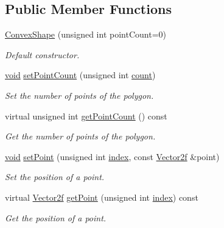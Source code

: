 \subsection*{Public Member Functions}
\begin{DoxyCompactItemize}
\item 
\hyperlink{classsf_1_1_convex_shape_a4f4686f57622bfbbe419ac1420b1432a}{Convex\-Shape} (unsigned int point\-Count=0)
\begin{DoxyCompactList}\small\item\em Default constructor. \end{DoxyCompactList}\item 
\hyperlink{glutf90_8h_ac778d6f63f1aaf8ebda0ce6ac821b56e}{void} \hyperlink{classsf_1_1_convex_shape_aea7c3f0f08f5cd457fe128a75b7c1e70}{set\-Point\-Count} (unsigned int \hyperlink{gl3_8h_a5b40aca7a9682963dd00a8f5aef0a901}{count})
\begin{DoxyCompactList}\small\item\em Set the number of points of the polygon. \end{DoxyCompactList}\item 
virtual unsigned int \hyperlink{classsf_1_1_convex_shape_af81b86134fe54f2d50d9fab0db065ef1}{get\-Point\-Count} () const 
\begin{DoxyCompactList}\small\item\em Get the number of points of the polygon. \end{DoxyCompactList}\item 
\hyperlink{glutf90_8h_ac778d6f63f1aaf8ebda0ce6ac821b56e}{void} \hyperlink{classsf_1_1_convex_shape_ae5c7f87d0e776952e2ec6f0aa12ded31}{set\-Point} (unsigned int \hyperlink{gl3_8h_a57f14e05b1900f16a2da82ade47d0c6d}{index}, const \hyperlink{namespacesf_acf03098c2577b869e2fa6836cc48f1a0}{Vector2f} \&point)
\begin{DoxyCompactList}\small\item\em Set the position of a point. \end{DoxyCompactList}\item 
virtual \hyperlink{namespacesf_acf03098c2577b869e2fa6836cc48f1a0}{Vector2f} \hyperlink{classsf_1_1_convex_shape_ae2a18b837cd4454e340599a220c09a34}{get\-Point} (unsigned int \hyperlink{gl3_8h_a57f14e05b1900f16a2da82ade47d0c6d}{index}) const 
\begin{DoxyCompactList}\small\item\em Get the position of a point. \end{DoxyCompactList}\end{DoxyCompactItemize}
